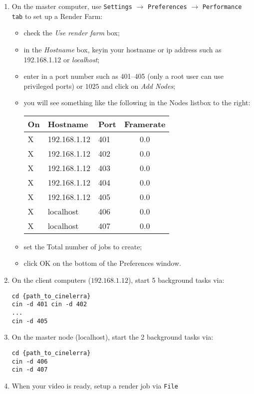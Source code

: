 \begin{enumerate}
\item On the master computer, use \texttt{Settings} $\rightarrow$
  \texttt{Preferences} $\rightarrow$ \texttt{Performance} \texttt{tab}
  to set up a Render Farm:
  \begin{itemize}
  \item check the \textit{Use render farm} box;
  \item in the \textit{Hostname} box, keyin your hostname or ip
    address such as 192.168.1.12 or \textit{localhost};
  \item enter in a port number such as 401--405 (only a root user
    can use privileged ports) or $1025$ and click on \textit{Add Nodes};
  \item you will see something like the following in the Nodes
    listbox to the right:\newline
    \begin{tabular}{lllc} On & Hostname & Port & Framerate
      \\\midrule
      X & 192.168.1.12 & 401 & 0.0 \\
      X & 192.168.1.12 & 402 & 0.0 \\
      X & 192.168.1.12 & 403 & 0.0 \\
      X & 192.168.1.12 & 404 & 0.0 \\
      X & 192.168.1.12 & 405 & 0.0 \\
      X & localhost & 406 & 0.0 \\
      X & localhost & 407 & 0.0 \\
    \end{tabular}
  \item set the Total number of jobs to create;
  \item click OK on the bottom of the Preferences window.
  \end{itemize}
\item On the client computers ($192.168.1.12$), start 5 background
  \CGG{} tasks via:
\begin{lstlisting}[style=sh]
cd {path_to_cinelerra}
cin -d 401 cin -d 402
...
cin -d 405
\end{lstlisting}
\item On the master node (localhost), start the 2 background \CGG{}
  tasks via:
\begin{lstlisting}[style=sh]
cd {path_to_cinelerra}
cin -d 406
cin -d 407
\end{lstlisting}
\item When your video is ready, setup a render job via \texttt{File
}
\end{enumerate}
